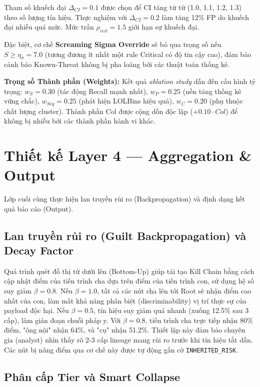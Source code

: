 \documentclass[../main.tex]{subfiles}
\begin{document}
Tham số khuếch đại \textbf{$\Delta_{CI} = 0.1$} được chọn để CI tăng từ từ (1.0, 1.1, 1.2, 1.3) theo số lượng tín hiệu. Thực nghiệm với $\Delta_{CI} = 0.2$ làm tăng 12\% FP do khuếch đại nhiễu quá mức. Mức trần \textbf{$\rho_{ceil} = 1.5$} giới hạn sự khuếch đại.

Đặc biệt, cơ chế \textbf{Screaming Sigma Override} sẽ bỏ qua trọng số nếu $S \ge \eta_\sigma = 7.0$ (tương đương ít nhất một rule Critical có độ tin cậy cao), đảm bảo cảnh báo Known-Threat không bị pha loãng bởi các thuật toán thống kê.

\textbf{Trọng số Thành phần (Weights):} Kết quả \textit{ablation study} dẫn đến cấu hình tỷ trọng: $w_S = 0.30$ (tác động Recall mạnh nhất), $w_P = 0.25$ (nền tảng thống kê vững chắc), $w_{Seq} = 0.25$ (phát hiện LOLBins hiệu quả), $w_C = 0.20$ (phụ thuộc chất lượng cluster). Thành phần Col được cộng dồn độc lập ($+0.10 \cdot Col$) để không bị nhiễu bởi các thành phần hành vi khác.

\section{Thiết kế Layer 4 — Aggregation \& Output}
\label{section:3.8}

Lớp cuối cùng thực hiện lan truyền rủi ro (Backpropagation) và định dạng kết quả báo cáo (Output).

\subsection{Lan truyền rủi ro (Guilt Backpropagation) và Decay Factor}
\label{subsection:3.8.1}

Quá trình quét đồ thị từ dưới lên (Bottom-Up) giúp tái tạo Kill Chain bằng cách cập nhật điểm của tiến trình cha dựa trên điểm của tiến trình con, sử dụng hệ số suy giảm \textbf{$\beta = 0.8$}. Nếu $\beta = 1.0$, tất cả các nút cha lên tới Root sẽ nhận điểm cao nhất của con, làm mất khả năng phân biệt (discriminability) vị trí thực sự của payload độc hại. Nếu $\beta = 0.5$, tín hiệu suy giảm quá nhanh (xuống 12.5\% sau 3 cấp), làm gián đoạn chuỗi pháp y. Với $\beta = 0.8$, tiến trình cha trực tiếp nhận 80\% điểm, "ông nội" nhận 64\%, và "cụ" nhận 51.2\%. Thiết lập này đảm bảo chuyên gia (analyst) nhìn thấy rõ 2-3 cấp lineage mang rủi ro trước khi tín hiệu tắt dần. Các nút bị nâng điểm qua cơ chế này được tự động gắn cờ \texttt{INHERITED\_RISK}.

\subsection{Phân cấp Tier và Smart Collapse}
\label{subsection:3.8.2}
\end{document}
